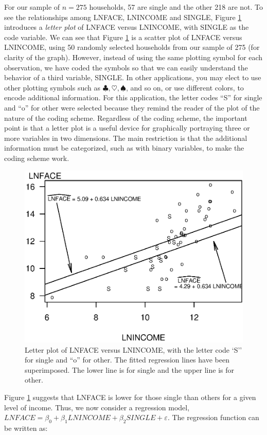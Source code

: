 For our sample of $n=275$ households, 57 are single and the other
218 are not.  To see the relationships among LNFACE, LNINCOME and
SINGLE, Figure \ref{F3:LinesLetterPlot} introduces a \emph{letter
plot} of LNFACE versus LNINCOME, with SINGLE as the code variable.
We can see that Figure \ref{F3:LinesLetterPlot} is a scatter plot of
LNFACE versus LNINCOME, using 50 randomly selected households from
our sample of 275 (for clarity of the graph). However, instead of
using the same plotting symbol for each observation, we have coded
the symbols so that we can easily understand the behavior of a third
variable, SINGLE. In other applications, you may elect to use other
plotting symbols such as $\clubsuit , \heartsuit , \spadesuit $, and
so on, or use different colors, to encode additional information.
For this application, the letter codes ``S'' for single and ``o''
for other were selected because they remind the reader of the plot
of the nature of the coding scheme. Regardless of the coding scheme,
the important point is that a letter plot is a useful device for
graphically portraying three or more variables in two dimensions.
The main restriction is that the additional information must be
categorized, such as with binary variables, to make the coding
scheme work.

\begin{figure}[htp]
  \begin{center}
    \includegraphics[width=.6\textwidth]{Chapter3/F3LinesLetterPlot.eps}
    \caption{\label{F3:LinesLetterPlot} \small Letter plot of LNFACE versus LNINCOME,
    with the letter code `S'' for single
and ``o'' for other. The fitted regression lines have been
superimposed. The lower line is for single and the upper line is for
other.}
  \end{center}
\end{figure}


Figure \ref{F3:LinesLetterPlot} suggests that LNFACE is lower for
those single than others for a given level of income. Thus, we now
consider a regression model, $LNFACE = \beta_0 + \beta_1 LNINCOME +
\beta_2 SINGLE + \varepsilon$. The regression function can be
written as:

